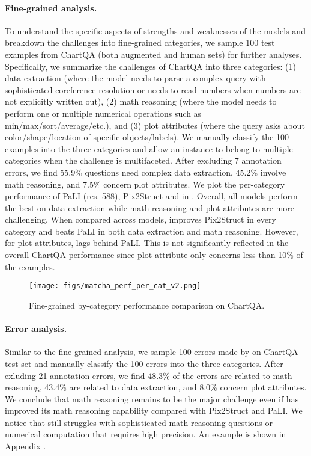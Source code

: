\paragraph{Fine-grained analysis.}
To understand the specific aspects of strengths and weaknesses of the models and breakdown the challenges into fine-grained categories, we sample 100 test examples from ChartQA (both augmented and human sets) for further analyses. Specifically, we summarize the challenges of ChartQA into three categories: (1) data extraction (where the model needs to parse a complex query with sophisticated coreference resolution or needs to read numbers when numbers are not explicitly written out), (2) math reasoning (where the model needs to perform one or multiple numerical operations such as min/max/sort/average/etc.), and (3) plot attributes (where the query asks about color/shape/location of specific objects/labels). We manually classify the 100 examples into the three categories and allow an instance to belong to multiple categories when the challenge is multifaceted. After excluding 7 annotation errors, we find 55.9\% questions need complex data extraction, 45.2\% involve math reasoning, and 7.5\% concern plot attributes. We plot the per-category performance of PaLI (res. 588), Pix2Struct and \model{} in . Overall, all models perform the best on data extraction while math reasoning and plot attributes are more challenging. When compared across models, \model{} improves Pix2Struct in every category and beats PaLI in both data extraction and math reasoning. However, for plot attributes, \model{} lags behind PaLI. This is not significantly reflected in the overall ChartQA performance since plot attribute only concerns less than 10\% of the examples.

\begin{figure}[!ht]
\centering
\texttt{[image: figs/matcha\_perf\_per\_cat\_v2.png]}
\caption{Fine-grained by-category performance comparison on ChartQA.}
\label{fig:finegrained}
\end{figure}


\paragraph{Error analysis.} 
Similar to the fine-grained analysis, we sample 100 errors made by \model{} on ChartQA test set and manually classify the 100 errors into the three categories. After exluding 21 annotation errors, we find 48.3\% of the errors are related to math reasoning, 43.4\% are related to data extraction, and 8.0\% concern plot attributes. We conclude that math reasoning remains to be the major challenge even if \model{} has improved its math reasoning capability compared with Pix2Struct and PaLI. We notice that \model{} still struggles with sophisticated math reasoning questions or numerical computation that requires high precision. An example is shown in Appendix .

